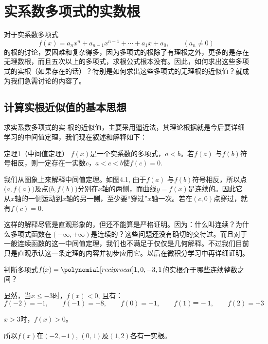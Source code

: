 \section{实系数多项式的实数根}
对于实系数多项式
\[f(x)=a_nx^n+a_{n-1}x^{n-1}+\cdots+a_1x+a_0,\qquad (a_n\ne 0)\]
的根的讨论，要困难和复杂得多，因为多项式的根除了有理根之外，更多的是存在无理数根，而且五次以上的多项式，求根公式根本没有。因此，如何求出这些多项式的实根（如果存在的话）？特别是如何求出这些多项式的无理根的近似值？就成为我们急需讨论的内容了。

\subsection{计算实根近似值的基本思想}
求实系数多项式的实
根的近似值，主要采用逼近法，其理论根据就是今后要详细学习的中间值定理，我们现在叙述和解释如下：

\begin{blk}{定理1（中间值定理）}
    $f(x)$是一个实系数的多项式，$a<b$。若$f(a)$
    与$f(b)$符号相反，则一定存在一实数$c$，$a<c<b$使$f(c)=0$.
\end{blk}

我们从图象上来解释中间值定理。如图4.1, 由于$f(a)$
与$f(b)$符号相反，所以点$\big(a,f(a)\big)$及点$\big(b,f(b)\big)$分别在$x$轴的两侧，而曲线$y=f(x)$是连续的。因此它从$x$轴的一侧运动到$x$轴的另一侧，至少要“穿过”$x$轴一次。若在$(c,0)$点穿过，就有$f(c)=0$.

\begin{figure}[htp]
    \centering
\begin{tikzpicture}[>=latex]
    
\end{tikzpicture}
    \caption{}
\end{figure}

这样的解释尽管是直观形象的，但还不能算是严格证明。因为：什么叫连续？为什么多项式函数在$(-\infty,+\infty)$是连续的？这些问题还没有确切的交待过。而且对于一般连续函数的这一中间值定理，我们也不满足于仅仅是几何解释。不过我们目前只是直观承认这一条定理的内容并初步应用它。以后在微积分学习中再详细证明。

\begin{example}
    判断多项式$f(x)=\poly{1,0,-3,1}$的实根介于哪些连续整数之间？
\end{example}

\begin{solution}
显然，当$x\le -3$时，$f(x)<0$, 且有：
\[f (-2) =-1,\qquad f (-1) =+8,\qquad f (0) =+1,\qquad f (1)＝-1,\qquad f(2)=+3\]

$x>3$时，$f(x)>0$。

所以$f(x)$在$(-2,-1)$, $(0, 1)$及$(1, 2)$各有一实根。
\end{solution}
    
